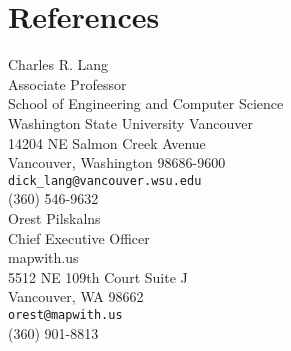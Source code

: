 \documentclass[10pt]{article}
\begin{document}

%



\section*{References}

Charles R. Lang\\ 
Associate Professor \\
School of Engineering and Computer Science \\
Washington State University Vancouver \\
14204 NE Salmon Creek Avenue \\
Vancouver, Washington 98686-9600 \\
\verb$dick_lang@vancouver.wsu.edu$ \\
(360) 546-9632\\


Orest Pilskalns\\
Chief Executive Officer\\
mapwith.us\\
5512 NE 109th Court Suite J\\
Vancouver, WA 98662 \\
{\tt orest@mapwith.us} \\
(360) 901-8813\\
\end{document}
